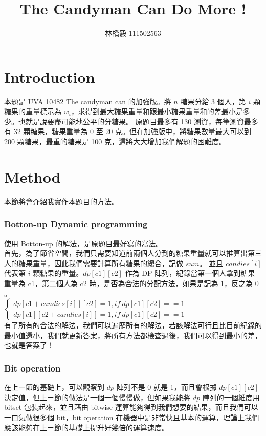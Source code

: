 \documentclass[12pt]{article}
\title{The Candyman Can Do More ! }
\author{林橋毅 111502563}
\begin{document}
	
	\maketitle
	
	\part{Introduction}
	本題是 UVA 10482 The candyman can 的加強版。將 $n$ 糖果分給 3 個人，第 $i$ 顆糖果的重量標示為 $w_i$，求得到最大糖果重量和跟最小糖果重量和的差最小是多少。也就是說要盡可能地公平的分糖果。
	原題目最多有 130 測資，每筆測資最多有 32 顆糖果，糖果重量為 0 至 20 克。但在加強版中，將糖果數量最大可以到 200 顆糖果，最重的糖果是 100 克，這將大大增加我們解題的困難度。 
	\part{Method}
	本節將會介紹我實作本題目的方法。
	\section{Botton-up Dynamic programming}
	使用 Botton-up 的解法，是原題目最好寫的寫法。\\
	
	首先，為了節省空間，我們只需要知道前兩個人分到的糖果重量就可以推算出第三人的糖果重量，因此我們需要計算所有糖果的總合，記做 $sum$。
	並且 $candies[i]$ 代表第 $i$ 顆糖果的重量。$dp[c1][c2]$ 作為 DP 陣列，紀錄當第一個人拿到糖果重量為 c1，第二個人為 c2 時，是否為合法的分配方法，如果是記為 $1$，反之為 $0$。\\
	
	$\left\{\begin{matrix}
		dp[c1+candies[i]][c2] = 1, if \ dp[c1][c2] == 1\\ 
		dp[c1][c2+candies[i]] = 1, if \ dp[c1][c2] == 1
	\end{matrix}\right.$\\ 

	有了所有的合法的解法，我們可以遍歷所有的解法，若該解法可行且比目前紀錄的最小值還小，我們就更新答案，將所有方法都檢查過後，我們可以得到最小的差，也就是答案了！
	
	\section{Bit operation}
	在上ㄧ節的基礎上，可以觀察到 $dp$ 陣列不是 0 就是 1，而且會根據 $dp[c1][c2]$ 決定值，但上ㄧ節的做法是一個一個慢慢做，但如果我能將 $dp$ 陣列的一個維度用 bitset 包裝起來，並且藉由 bitwise 運算能夠得到我們想要的結果，而且我們可以一口氣做很多個 bit，bit operation 在機器中是非常快且基本的運算，理論上我們應該能夠在上ㄧ節的基礎上提升好幾倍的運算速度。
	
\end{document}
